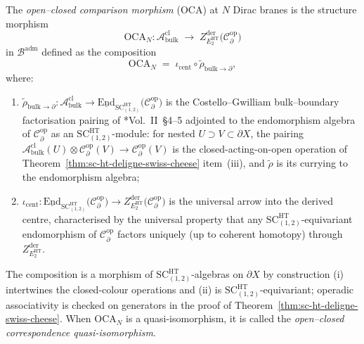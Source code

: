 \begin{defn}\label{defn:oca-comparison}
The \emph{open--closed comparison morphism} (\(\mathrm{OCA}\)) at \(N\)
Dirac branes is the structure morphism
\begin{equation}\label{eq:oca-definition}
  \mathrm{OCA}_N\colon
    \mathcal A^{\mathrm{cl}}_{\mathrm{bulk}}
    \;\longrightarrow\;
    Z^{\mathrm{der}}_{E_2^{\mathrm{HT}}}\!\bigl(
      \mathcal C^{\mathrm{op}}_\partial\bigr)
\end{equation}
in \(\mathcal B^{\mathrm{adm}}\) defined as the composition
\begin{equation}\label{eq:oca-composition}
  \mathrm{OCA}_N
   \;=\;
   \iota_{\mathrm{cent}}\circ\widetilde{\rho}_{\mathrm{bulk}\to\partial},
\end{equation}
where:
\begin{enumerate}[label=\textup{(\roman*)}]
  \item \(\widetilde{\rho}_{\mathrm{bulk}\to\partial}\colon
        \mathcal A^{\mathrm{cl}}_{\mathrm{bulk}}\to
        \underline{\mathrm{End}}_{\mathrm{SC}^{\mathrm{HT}}_{(1,2)}}\!
          \bigl(\mathcal C^{\mathrm{op}}_\partial\bigr)\) is the
        Costello--Gwilliam bulk--boundary factorisation pairing of
        \cite{costello-gwilliam}*{Vol.~II~\S 4--5} adjointed to the
        endomorphism algebra of \(\mathcal C^{\mathrm{op}}_\partial\)
        as an \(\mathrm{SC}^{\mathrm{HT}}_{(1,2)}\)-module: for nested
        \(U\supset V\subset\partial X\), the pairing
        \(\mathcal A^{\mathrm{cl}}_{\mathrm{bulk}}(U)\otimes
        \mathcal C^{\mathrm{op}}_\partial(V)\to
        \mathcal C^{\mathrm{op}}_\partial(V)\) is the closed-acting-on-open
        operation of Theorem~\ref{thm:sc-ht-deligne-swiss-cheese} item~(iii),
        and \(\widetilde\rho\) is its currying to the endomorphism algebra;
  \item \(\iota_{\mathrm{cent}}\colon
        \underline{\mathrm{End}}_{\mathrm{SC}^{\mathrm{HT}}_{(1,2)}}\!
          \bigl(\mathcal C^{\mathrm{op}}_\partial\bigr)\to
        Z^{\mathrm{der}}_{E_2^{\mathrm{HT}}}\!\bigl(
          \mathcal C^{\mathrm{op}}_\partial\bigr)\) is the universal
        arrow into the derived centre, characterised by the universal
        property that any \(\mathrm{SC}^{\mathrm{HT}}_{(1,2)}\)-equivariant
        endomorphism of \(\mathcal C^{\mathrm{op}}_\partial\) factors
        uniquely (up to coherent homotopy) through
        \(Z^{\mathrm{der}}_{E_2^{\mathrm{HT}}}\).
\end{enumerate}
The composition is a morphism of
\(\mathrm{SC}^{\mathrm{HT}}_{(1,2)}\)-algebras on \(\partial X\) by
construction (i) intertwines the closed-colour operations and (ii) is
\(\mathrm{SC}^{\mathrm{HT}}_{(1,2)}\)-equivariant; operadic
associativity is checked on generators in the proof of
Theorem~\ref{thm:sc-ht-deligne-swiss-cheese}.  When
\(\mathrm{OCA}_N\) is a quasi-isomorphism, it is called the
\emph{open--closed correspondence quasi-isomorphism}.
\end{defn}

